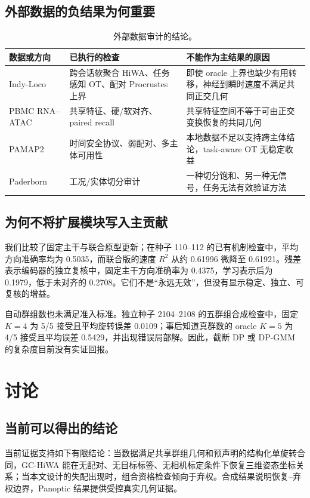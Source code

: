 \documentclass[10pt,a4paper,fontset=windows]{ctexart}
\theoremstyle{definition}
\theoremstyle{remark}
\begin{document}
\subsection{外部数据的负结果为何重要}
\begin{table}[H]
\centering
\caption{外部数据审计的结论。}
\label{tab:negative}
\begin{tabularx}{0.96\linewidth}{lYY}
\toprule
数据或方向 & 已执行的检查 & 不能作为主结果的原因\\
\midrule
Indy-Loco & 跨会话软聚合 HiWA、任务感知 OT、配对 Procrustes 上界 & 即使 oracle 上界也缺少有用转移，神经到瞬时速度不满足共同正交几何\\
PBMC RNA--ATAC & 共享特征、硬/软对齐、paired recall & 共享特征空间不等于可由正交变换恢复的共同几何\\
PAMAP2 & 时间安全协议、弱配对、多主体可用性 & 本地数据不足以支持跨主体结论，task-aware OT 无稳定收益\\
Paderborn & 工况/实体切分审计 & 一种切分饱和、另一种无信号，任务无法有效验证方法\\
\bottomrule
\end{tabularx}
\end{table}

\subsection{为何不将扩展模块写入主贡献}
我们比较了固定主干与联合原型更新；在种子 110--112 的已有机制检查中，平均方向准确率均为 0.5035，而联合版的速度 $R^2$ 从约 0.61996 微降至 0.61921。残差表示编码器的独立复核中，固定主干方向准确率为 0.4375，学习表示后为 0.1979，低于未对齐的 0.2708。它们不是“永远无效”，但没有显示稳定、独立、可复核的增益。

自动群组数也未满足准入标准。独立种子 2104--2108 的五群组合成检查中，固定 $K=4$ 为 5/5 接受且平均旋转误差 0.0109；事后知道真群数的 oracle $K=5$ 为 4/5 接受且平均误差 0.5429，并出现错误局部解。因此，截断 DP 或 DP-GMM 的复杂度目前没有实证回报。

\section{讨论}
\label{sec:discussion}

\subsection{当前可以得出的结论}
当前证据支持如下有限结论：当数据满足共享群组几何和预声明的结构化单旋转合同，GC-HiWA 能在无配对、无目标标签、无相机标定条件下恢复三维姿态坐标关系；当本文设计的失配出现时，组合资格检查倾向于弃权。合成结果说明恢复--弃权边界，Panoptic 结果提供受控真实几何证据。
\end{document}
